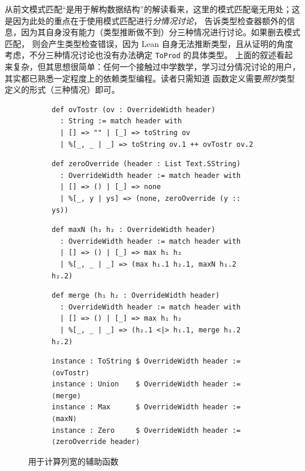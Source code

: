 \documentclass[a4paper, 11pt]{article}
\theoremstyle{remark}\newtheorem*{remark}{Remark}
\theoremstyle{definition}\newtheorem*{definition}{Definition}
\begin{document}
从前文模式匹配“是用于解构数据结构”的解读看来，这里的模式匹配毫无用处；这是因为此处的重点在于使用模式匹配进行\emph{分情况讨论}，
告诉类型检查器额外的信息，因为其自身没有能力（类型推断做不到）分三种情况进行讨论。如果删去模式匹配，
则会产生类型检查错误，因为 Lean 自身无法推断类型，且从证明的角度考虑，不分三种情况讨论也没有办法确定 \texttt{ToProd} 的具体类型。
上面的叙述看起来复杂，但其思想很简单：任何一个接触过中学数学，学习过分情况讨论的用户，其实都已熟悉一定程度上的依赖类型编程。读者只需知道
函数定义需要\emph{照抄}类型定义的形式（三种情况）即可。

\begin{figure}
\centering
\begin{subfigure}{0.55\textwidth}\centering
\begin{verbatim}
def ovTostr (ov : OverrideWidth header)
  : String := match header with
  | [] => "" | [_] => toString ov
  | %[_, _ | _] => toString ov.1 ++ ovTostr ov.2
\end{verbatim}
\end{subfigure}%
\begin{subfigure}{0.55\textwidth}\centering
\begin{verbatim}
def zeroOverride (header : List Text.SString)
  : OverrideWidth header := match header with
  | [] => () | [_] => none
  | %[_, y | ys] => (none, zeroOverride (y :: ys))
\end{verbatim}
\end{subfigure}\vspace{1em}
\begin{subfigure}{0.55\textwidth}\centering
\begin{verbatim}
def maxN (h₁ h₂ : OverrideWidth header)
  : OverrideWidth header := match header with
  | [] => () | [_] => max h₁ h₂
  | %[_, _ | _] => (max h₁.1 h₂.1, maxN h₁.2 h₂.2)
\end{verbatim}
\end{subfigure}%
\begin{subfigure}{0.55\textwidth}\centering
\begin{verbatim}
def merge (h₁ h₂ : OverrideWidth header)
  : OverrideWidth header := match header with
  | [] => () | [_] => max h₁ h₂
  | %[_, _ | _] => (h₂.1 <|> h₁.1, merge h₁.2 h₂.2)
\end{verbatim}
\end{subfigure}\vspace{1em}
\begin{subfigure}{\textwidth}\centering
\begin{verbatim}
instance : ToString $ OverrideWidth header := ⟨ovTostr⟩
instance : Union    $ OverrideWidth header := ⟨merge⟩
instance : Max      $ OverrideWidth header := ⟨maxN⟩
instance : Zero     $ OverrideWidth header := ⟨zeroOverride header⟩
\end{verbatim}
\end{subfigure}
\caption{用于计算列宽的辅助函数}\label{code:pp-col}
\end{figure}
\end{document}
